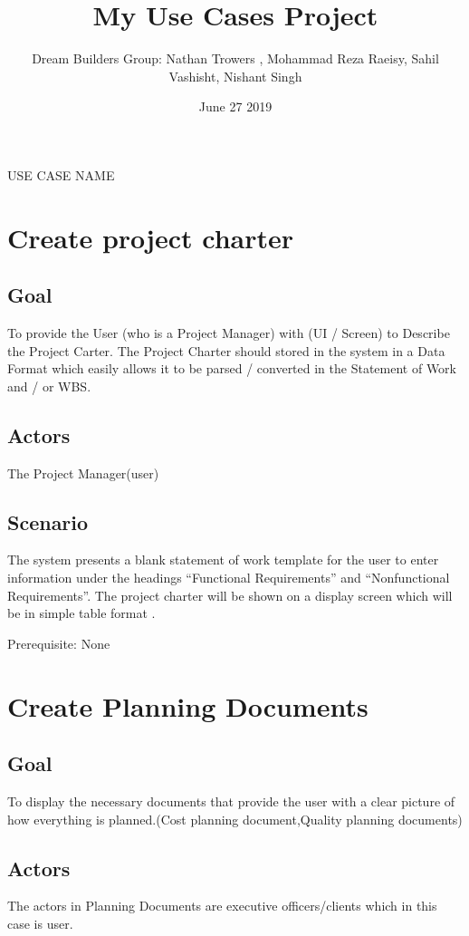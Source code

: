 \documentclass[10pt]{article}
\title{My Use Cases Project}
\author{Dream Builders Group: Nathan Trowers , Mohammad Reza Raeisy, Sahil Vashisht, Nishant Singh }
\date{June 27 2019}
\begin{document}
\maketitle

USE CASE NAME

\section{Create project charter} 

    \subsection{Goal}To provide the User (who is a Project Manager) with (UI / Screen) to Describe the Project Carter. The Project Charter should stored in the system in a Data Format which easily allows it to be parsed / converted in the Statement of Work and / or WBS.
    

    \subsection{Actors}The Project Manager(user) 

    \subsection{Scenario}The system presents a blank statement of work template for the user to enter information under the headings “Functional Requirements” and “Nonfunctional Requirements”.  
The project charter will be shown on a display screen which will be in simple table format .

    Prerequisite: None



\section{Create Planning Documents}

    \subsection{Goal}To display the necessary documents that provide the user with a clear picture of how everything is planned.(Cost planning document,Quality planning documents)
    
    \subsection{Actors}The actors in Planning Documents are executive officers/clients which in this case is user.
    
\end{document}
